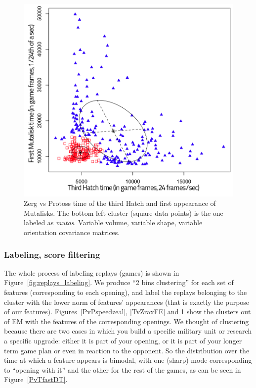 \begin{figure}[h]
\centerline{\includegraphics[width=0.66\columnwidth]{images/ZvPmutas.png}}
\caption{Zerg vs Protoss time of the third Hatch and first appearance of Mutalisks. The bottom left cluster (square data points) is the one labeled as \textit{mutas}. Variable volume, variable shape, variable orientation covariance matrices.}
\label{ZvPmutas}
\end{figure}



\subsubsection{Labeling, score filtering}
The whole process of labeling replays (games) is shown in Figure~\ref{fig:replays_labeling}.
We produce ``2 bins clustering'' for each set of features (corresponding to each opening), and label the replays belonging to the cluster with the lower norm of features' appearances (that is exactly the purpose of our features). Figures~\ref{PvPspeedzeal}, \ref{TvZraxFE}
and \ref{ZvPmutas} show the clusters out of EM with the features of the corresponding openings. We thought of clustering because there are two cases in which you build a specific military unit or research a specific upgrade: either it is part of your opening, or it is part of your longer term game plan or even in reaction to the opponent. So the distribution over the time at which a feature appears is bimodal, with one (sharp) mode corresponding to ``opening with it'' and the other for the rest of the games, as can be seen in Figure~\ref{PvTfastDT}.

